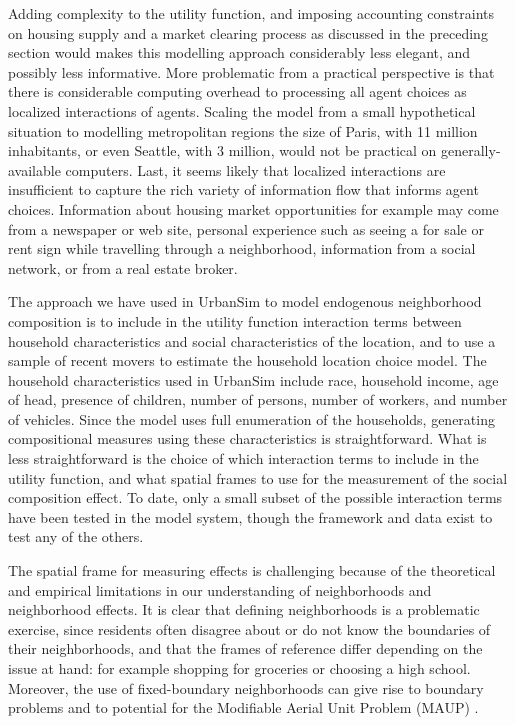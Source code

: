 \documentclass[12pt,a4paper]{article}
\begin{document}
Adding complexity to the utility function, and imposing accounting
constraints on housing supply and a market clearing process as
discussed in the preceding section would makes this modelling
approach considerably less elegant, and possibly less informative.
More problematic from a practical perspective is that there is
considerable computing overhead to processing all agent choices as
localized interactions of agents.  Scaling the model from a small
hypothetical situation to modelling metropolitan regions the size
of Paris, with 11 million inhabitants, or even Seattle, with 3
million, would not be practical on generally-available computers.
Last, it seems likely that localized interactions are insufficient
to capture the rich variety of information flow that informs agent
choices.  Information about housing market opportunities for
example may come from a newspaper or web site, personal experience
such as seeing a for sale or rent sign while travelling through a
neighborhood, information from a social network, or from a real
estate broker.

The approach we have used in UrbanSim to model endogenous
neighborhood composition is to include in the utility function
interaction terms between household characteristics and social
characteristics of the location, and to use a sample of recent
movers to estimate the household location choice model.  The
household characteristics used in UrbanSim include race, household
income, age of head, presence of children, number of persons,
number of workers, and number of vehicles.  Since the model uses
full enumeration of the households, generating compositional
measures using these characteristics is straightforward. What is
less straightforward is the choice of which interaction terms to
include in the utility function, and what spatial frames to use
for the measurement of the social composition effect.  To date,
only a small subset of the possible interaction terms have been
tested in the model system, though the framework and data exist to
test any of the others.

The spatial frame for measuring effects is challenging because of
the theoretical and empirical limitations in our understanding of
neighborhoods and neighborhood effects.  It is clear that defining
neighborhoods is a problematic exercise, since residents often
disagree about or do not know the boundaries of their
neighborhoods, and that the frames of reference differ depending
on the issue at hand: for example shopping for groceries or
choosing a high school.  Moreover, the use of fixed-boundary
neighborhoods can give rise to boundary problems and to potential
for the Modifiable Aerial Unit Problem (MAUP)
\cite{openshaw-taylor-1981}.
\end{document}
